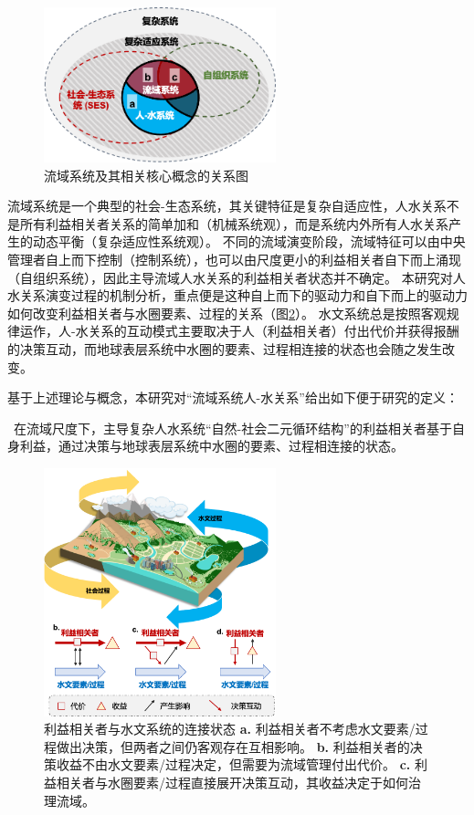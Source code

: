 \begin{figure}[htb] %
    \centering
    \includegraphics[width=0.6\textwidth]{img/ch2/ch2_concepts.png}
    \caption{流域系统及其相关核心概念的关系图}\label{ch2:fig:concepts}
\end{figure}

流域系统是一个典型的社会-生态系统，其关键特征是复杂自适应性，人水关系不是所有利益相关者关系的简单加和（机械系统观），而是系统内外所有人水关系产生的动态平衡（复杂适应性系统观）。
不同的流域演变阶段，流域特征可以由中央管理者自上而下控制（控制系统），也可以由尺度更小的利益相关者自下而上涌现（自组织系统），因此主导流域人水关系的利益相关者状态并不确定。
本研究对人水关系演变过程的机制分析，重点便是这种自上而下的驱动力和自下而上的驱动力如何改变利益相关者与水圈要素、过程的关系（图\ref{ch2:fig:interactions}）。
水文系统总是按照客观规律运作，人-水关系的互动模式主要取决于人（利益相关者）付出代价并获得报酬的决策互动，而地球表层系统中水圈的要素、过程相连接的状态也会随之发生改变。

基于上述理论与概念，本研究对“流域系统人-水关系”给出如下便于研究的定义：

{\kai~在流域尺度下，主导复杂人水系统“自然-社会二元循环结构”的利益相关者基于自身利益，通过决策与地球表层系统中水圈的要素、过程相连接的状态。}

\begin{figure}[htb]
    \centering
    \includegraphics[width=0.6\textwidth]{img/ch2/ch2_interactions.png}
    \caption[利益相关者与水文系统的连接状态]{利益相关者与水文系统的连接状态
        \textbf{a.} 利益相关者不考虑水文要素/过程做出决策，但两者之间仍客观存在互相影响。
        \textbf{b.} 利益相关者的决策收益不由水文要素/过程决定，但需要为流域管理付出代价。
        \textbf{c.} 利益相关者与水圈要素/过程直接展开决策互动，其收益决定于如何治理流域。
    }\label{ch2:fig:interactions}
\end{figure}
